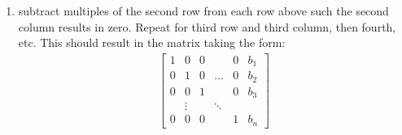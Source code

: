 \documentclass{article}
\theoremstyle{mytheoremstyle}
\theoremstyle{mytheoremstyle}
\theoremstyle{myproblemstyle}
\begin{document}
\begin{enumerate}
        \item subtract multiples of the second row from each row above such the
            second column results in zero. Repeat for third row and third
            column, then fourth, etc. This should result in the matrix taking
            the form:
        \begin{align*}
            \begin{bmatrix}
                1 & 0      & 0      &        & 0      & b_1 \\
                0 & 1      & 0      & \ldots & 0      & b_2 \\
                0 & 0      & 1      &        & 0      & b_3 \\
                  & \vdots &        & \ddots &        &     \\
                0 & 0      & 0      &        & 1      & b_n
            \end{bmatrix}
        \end{align*}
    \end{enumerate}
\end{document}

